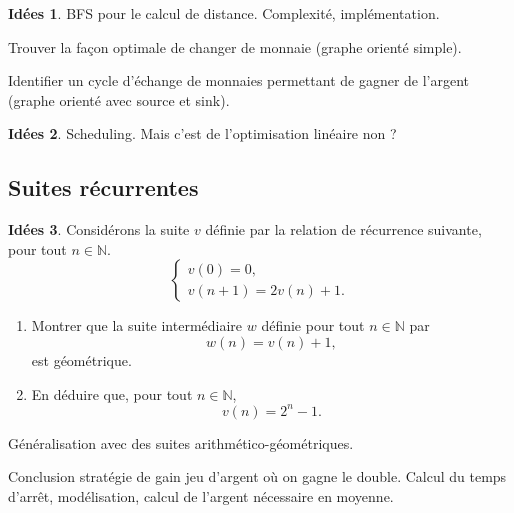\documentclass[a4paper,12pt, notitlepage]{article}
\theoremstyle{definition}
\newtheorem{idee}{Idées}
\newcommand{\N}{\mathbb{N}}
\begin{document}
\begin{idee}
	BFS pour le calcul de distance. Complexité, implémentation.
	
	Trouver la façon optimale de changer de monnaie (graphe orienté simple).
	
	Identifier un cycle d'échange de monnaies permettant de gagner de l'argent (graphe orienté avec source et sink).
\end{idee}

\begin{idee}
	Scheduling. Mais c'est de l'optimisation linéaire non ?
\end{idee}

\subsection{Suites récurrentes}

\begin{idee}
	Considérons la suite $v$ définie par la relation de récurrence suivante, pour tout $n\in\N$.
    \[
    \begin{cases}
        v(0) = 0, \\
        v(n+1) = 2v(n) + 1.
    \end{cases}
    \]
    \begin{enumerate}
        \item Montrer que la suite intermédiaire $w$ définie pour tout $n\in\N$ par
            \[ w(n) = v(n) + 1,\]
        est géométrique.
        \item En déduire que, pour tout $n\in\N$,
            \[ v(n) = 2^n - 1.\]
    \end{enumerate}

	Généralisation avec des suites arithmético-géométriques.
	
	
	Conclusion stratégie de gain jeu d'argent où on gagne le double.
	Calcul du temps d'arrêt, modélisation, calcul de l'argent nécessaire en moyenne.
\end{idee}
\end{document}
